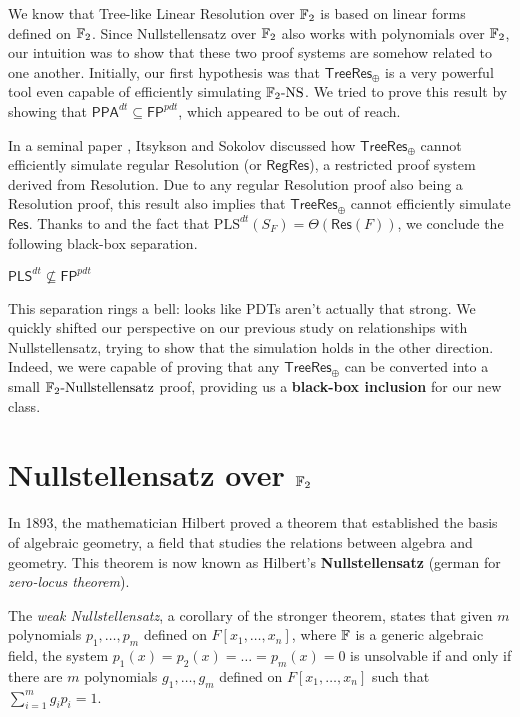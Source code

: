 We know that Tree-like Linear Resolution over $\mathbb{F}_2$ is based on linear forms defined on $\mathbb{F}_2$. Since Nullstellensatz over $\mathbb{F}_2$ also works with polynomials over $\mathbb{F}_2$, our intuition was to show that these two proof systems are somehow related to one another. Initially, our first hypothesis was that $\mathsf{TreeRes}_\oplus$ is a very powerful tool even capable of efficiently simulating $\mathrm{\mathbb{F}_2\text{-}NS}$. We tried to prove this result by showing that $\mathsf{PPA}^{dt} \subseteq \mathsf{FP}^{pdt}$, which appeared to be out of reach.

In a seminal paper \cite{res_lin_2}, Itsykson and Sokolov discussed how $\mathsf{TreeRes}_\oplus$ cannot efficiently simulate regular Resolution (or $\mathsf{RegRes}$), a restricted proof system derived from Resolution. Due to any regular Resolution proof also being a Resolution proof, this result also implies that $\mathsf{TreeRes}_\oplus$ cannot efficiently simulate $\mathsf{Res}$. Thanks to  and the fact that $\mathrm{PLS}^{dt}(S_F) = \Theta(\mathsf{Res}(F))$, we conclude the following black-box separation.

\begin{proposition}
    \label{pls_not_inside_fp_pdt}
    $\mathsf{PLS}^{dt} \not\subseteq \mathsf{FP}^{pdt}$
\end{proposition}

\newpage

This separation rings a bell: looks like PDTs aren't actually that strong. We quickly shifted our perspective on our previous study on relationships with Nullstellensatz, trying to show that the simulation holds in the other direction. Indeed, we were capable of proving that any $\mathsf{TreeRes}_\oplus$ can be converted into a small $\mathrm{\mathbb{F}_2\text{-}Nullstellensatz}$ proof, providing us a \textbf{black-box inclusion} for our new class.

\section{Nullstellensatz over $\mathbb{F}_2$}

In 1893, the mathematician Hilbert proved a theorem that established the basis of algebraic geometry, a field that studies the relations between algebra and geometry. This theorem is now known as Hilbert's \textbf{Nullstellensatz} (german for \textit{zero-locus theorem}).

The \textit{weak Nullstellensatz}, a corollary of the stronger theorem, states that given $m$ polynomials $p_1, \ldots, p_m$ defined on $F[x_1, \ldots, x_n]$, where $\mathbb{F}$ is a generic algebraic field, the system $p_1(x) = p_2(x) = \ldots = p_m(x) = 0$ is unsolvable if and only if there are $m$ polynomials $g_1, \ldots, g_m$ defined on $F[x_1, \ldots, x_n]$ such that $\sum_{i=1}^m g_ip_i = 1$.

